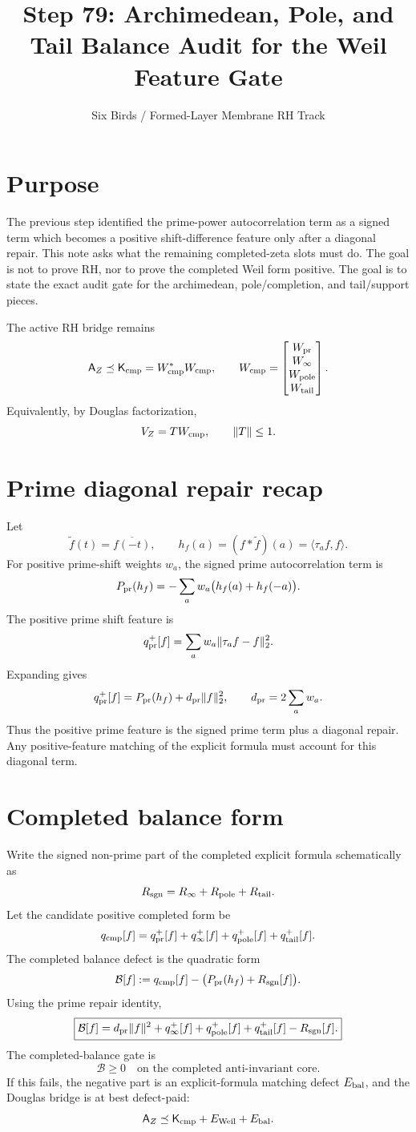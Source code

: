 \documentclass[11pt]{article}
\title{Step 79: Archimedean, Pole, and Tail Balance Audit for the Weil Feature Gate}
\author{Six Birds / Formed-Layer Membrane RH Track}
\date{}
\begin{document}
\maketitle

\section{Purpose}
The previous step identified the prime-power autocorrelation term as a signed term which becomes a positive shift-difference feature only after a diagonal repair.  This note asks what the remaining completed-zeta slots must do.  The goal is not to prove RH, nor to prove the completed Weil form positive.  The goal is to state the exact audit gate for the archimedean, pole/completion, and tail/support pieces.

The active RH bridge remains
\[
  \mathsf A_Z \preceq \mathsf K_{\rm cmp}
  = W_{\rm cmp}^*W_{\rm cmp},
  \qquad
  W_{\rm cmp}=
  \begin{bmatrix}
  W_{\rm pr}\\ W_\infty\\ W_{\rm pole}\\ W_{\rm tail}
  \end{bmatrix}.
\]
Equivalently, by Douglas factorization,
\[
  V_Z = T W_{\rm cmp},\qquad \|T\|\le 1.
\]

\section{Prime diagonal repair recap}
Let
\[
  \widetilde f(t)=\overline{f(-t)},
  \qquad
  h_f(a)=(f*\widetilde f)(a)=\langle \tau_a f,f\rangle.
\]
For positive prime-shift weights \(w_a\), the signed prime autocorrelation term is
\[
  P_{\rm pr}(h_f)= -\sum_a w_a\bigl(h_f(a)+h_f(-a)\bigr).
\]
The positive prime shift feature is
\[
  q_{\rm pr}^+[f]
  =\sum_a w_a\|\tau_a f-f\|_2^2.
\]
Expanding gives
\[
  q_{\rm pr}^+[f]
  =P_{\rm pr}(h_f)+d_{\rm pr}\|f\|_2^2,
  \qquad
  d_{\rm pr}=2\sum_a w_a.
\]
Thus the positive prime feature is the signed prime term plus a diagonal repair.  Any positive-feature matching of the explicit formula must account for this diagonal term.

\section{Completed balance form}
Write the signed non-prime part of the completed explicit formula schematically as
\[
  R_{\rm sgn}=R_\infty+R_{\rm pole}+R_{\rm tail}.
\]
Let the candidate positive completed form be
\[
  q_{\rm cmp}[f]
  =q_{\rm pr}^+[f]+q_\infty^+[f]+q_{\rm pole}^+[f]+q_{\rm tail}^+[f].
\]
The completed balance defect is the quadratic form
\[
  \mathcal B[f]
  :=q_{\rm cmp}[f]-\bigl(P_{\rm pr}(h_f)+R_{\rm sgn}[f]\bigr).
\]
Using the prime repair identity,
\[
  \boxed{
  \mathcal B[f]
  =d_{\rm pr}\|f\|^2
  +q_\infty^+[f]+q_{\rm pole}^+[f]+q_{\rm tail}^+[f]
  -R_{\rm sgn}[f].}
\]
The completed-balance gate is
\[
  \boxed{\mathcal B\ge 0\quad\text{on the completed anti-invariant core}.}
\]
If this fails, the negative part is an explicit-formula matching defect \(E_{\rm bal}\), and the Douglas bridge is at best defect-paid:
\[
  \mathsf A_Z\preceq \mathsf K_{\rm cmp}+E_{\rm Weil}+E_{\rm bal}.
\]
\end{document}
